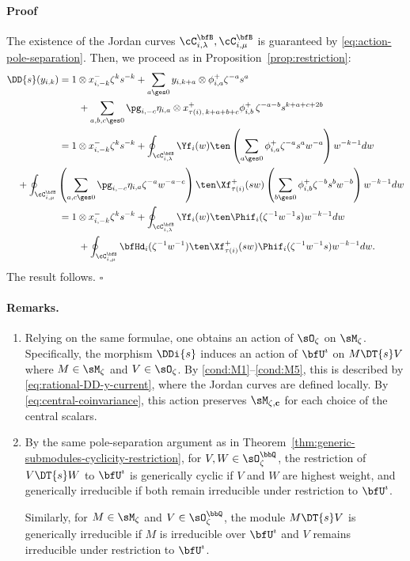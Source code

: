 \documentclass[reqno]{amsart}
\numberwithin{equation}{section}
\newenvironment{pf}{\medskip\paragraph{{\sc Proof}}}{\hfill$\square$\par\medskip}
\newenvironment{remarks}{\medskip\paragraph{{\bf Remarks.} }}{\par\medskip}
\begin{document}
\begin{pf}
The existence of the Jordan curves $\cC^\bfB_{i,\lambda},
\cC^\bfB_{i,\mu}$ is guaranteed by
\eqref{eq:action-pole-separation}. Then, we proceed as in
Proposition~\ref{prop:restriction}:
\begin{equation}
\begin{split}
	\DD{s}(y_{i,k})&=
	1\otimes x^-_{i,-k}\zeta^k s^{-k}
	+\sum_{a\ges 0}y_{i,k+a}\otimes \phi^+_{i,a}\zeta^{-a}s^a\\
	&\qquad+
	\sum_{a,b,c\ges 0}
	\pg_{i,-c}\eta_{i,a}\otimes x^+_{\tau(i),\,k+a+b+c}\phi^+_{i,b}
	\,\zeta^{-a-b}s^{k+a+c+2b}\\
	&=1\otimes x^-_{i,-k}\zeta^k s^{-k}
	+\oint_{\cC^\bfB_{i,\lambda}}\Yf_i(w)\ten
	\left(\sum_{a\ges0}\phi^+_{i,a}\zeta^{-a}s^aw^{-a}\right)w^{-k-1}dw\\
	&\hspace{-1.5cm}+\oint_{\cC_{i,\mu}^\bfB}
	\left(\sum_{a,c\ges 0}\pg_{i,-c}\eta_{i,a}\zeta^{-a}w^{-a-c}\right)
	\ten
	\Xf^+_{\tau(i)}(sw)\left(\sum_{b\ges 0}\phi^+_{i,b}\zeta^{-b}s^bw^{-b}\right)
	w^{-k-1}dw\\
	&=1\otimes x^-_{i,-k}\zeta^k s^{-k}
	+\oint_{\cC^\bfB_{i,\lambda}}\Yf_i(w)\ten\Phif_i(\zeta^{-1}w^{-1}s)w^{-k-1}dw\\
	&\qquad+\oint_{\cC_{i,\mu}^\bfB}
	\bfHd_i(\zeta^{-1}w^{-1})\ten\Xf^+_{\tau(i)}(sw)\Phif_i(\zeta^{-1}w^{-1}s)
	w^{-k-1}dw.
\end{split}
\end{equation}
The result follows.
\end{pf}

\begin{remarks}
\hfill
\begin{enumerate}[leftmargin=2em]\itemsep0.25cm
\item
Relying on the same formulae, one obtains an action of $\sO_\zeta$ on $\sM_\zeta$.
Specifically, the morphism $\DDi{s}$
induces an action of $\bfU^\imath$ on $M\DT{s}V$ where $M\in\sM_\zeta$ and 
$V\in\sO_\zeta$. By \ref{cond:M1}--\ref{cond:M5}, this is described by
\eqref{eq:rational-DD-y-current}, where the Jordan curves are defined locally.
By \eqref{eq:central-coinvariance}, this action preserves
$\sM_{\zeta,\mathbf c}$ for each choice of the central scalars.
\item 
By the same pole-separation argument as in Theorem~\ref{thm:generic-submodules-cyclicity-restriction},
for $V,W\in\sO_\zeta^\bbQ$, the restriction of $V\DT{s}W$ to
$\bfU^\imath$ is generically cyclic if $V$ and $W$ are highest weight,
and generically irreducible if both remain irreducible under restriction to $\bfU^\imath$.

Similarly, for $M\in\sM_\zeta$ and $V\in\sO_\zeta^\bbQ$, the module
$M\DT{s}V$ is generically irreducible if $M$ is irreducible over $\bfU^\imath$
and $V$ remains irreducible under restriction to $\bfU^\imath$.
\hfill\rmkend
\end{enumerate}
\end{remarks}
\end{document}
